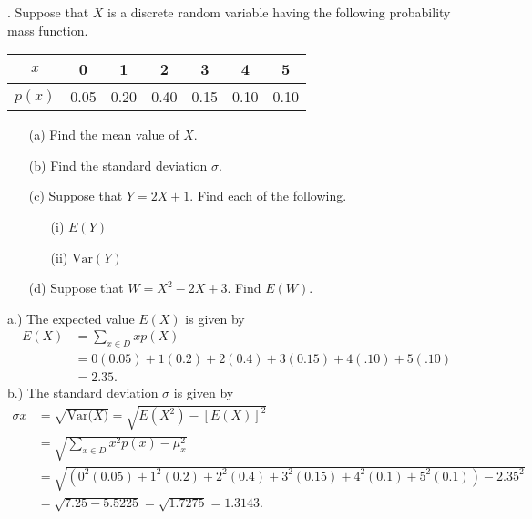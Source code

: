\documentclass{report}
\begin{document}
 \pagebreak \bigbreak \noindent 
 \begin{mdframed}
     . Suppose that \( X \) is a discrete random variable having the following probability mass function.

     \begin{center}
         \begin{tabular}{|c|c|c|c|c|c|c|}
             \hline
             \( x \) & 0 & 1 & 2 & 3 & 4 & 5 \\
             \hline
             \( p(x) \) & 0.05 & 0.20 & 0.40 & 0.15 & 0.10 & 0.10 \\
             \hline
         \end{tabular}
     \end{center}
     \begin{itemize}
         \item[(a)] Find the mean value of \( X \).
         \item[(b)] Find the standard deviation \( \sigma \).
         \item[(c)] Suppose that \( Y = 2X + 1 \). Find each of the following.
             \begin{itemize}
                 \item[(i)] \( E(Y) \)
                 \item[(ii)] \( \text{Var}(Y) \)
             \end{itemize}
         \item[(d)] Suppose that \( W = X^2 - 2X + 3 \). Find \( E(W) \).
     \end{itemize}
 \end{mdframed}
 \bigbreak \noindent 
 a.) The expected value $E(X)$ is given by
 \begin{align*}
     E(X) &= \sum_{x\in D}xp(X) \\
    &=0(0.05) + 1(0.2) + 2(0.4) + 3(0.15) + 4(.10) + 5(.10) \\
    &=2.35
 .\end{align*}
 \bigbreak \noindent 
 b.) The standard deviation $\sigma$ is given by
 \begin{align*}
     \sigma{x} &= \sqrt{\text{Var($X$)}} = \sqrt{E(X^{2}) - \left[E(X)\right]^{2}} \\
     &=\sqrt{\sum_{x\in D}x^{2}p(x) - \mu_{x}^{2}} \\
     &= \sqrt{(0^{2}(0.05) + 1^{2}(0.2) + 2^{2}(0.4) + 3^{2}(0.15) + 4^{2}(0.1) + 5^{2}(0.1)) - 2.35^{2}} \\
     &=\sqrt{7.25 - 5.5225} =\sqrt{1.7275} = 1.3143
 .\end{align*}
\end{document}

